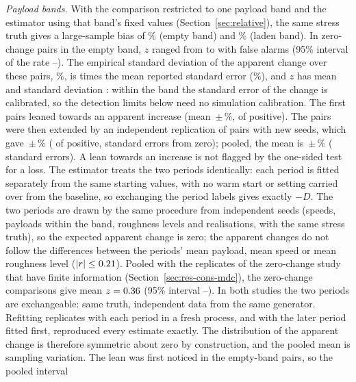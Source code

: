 \emph{Payload bands.} With the comparison restricted to one payload band and the estimator using that
band's fixed values (Section~\ref{sec:relative}), the same stress truth gives a large-sample bias of
\BandEmptyPseudo\% (empty band) and \BandLadenPseudo\% (laden band). In \BandEmptyPairsN{} zero-change
pairs in the empty band, $z$ ranged from \BandEmptyZMin{} to \BandEmptyZMax{} with \BandEmptyPairsFA{}
false alarms (95\% interval of the rate \BandEmptyPairsFALo--\BandEmptyPairsFAHi). The empirical
standard deviation of the apparent change over these pairs, \LeanSDPct\%, is \LeanSDOverSE{} times the
mean reported standard error (\LeanSEPct\%), and $z$ has mean \LeanZMean{} and standard deviation
\LeanZSD: within the band the standard error of the change is calibrated, so the detection limits below
need no simulation calibration. The first \LeanOneN{} pairs leaned towards an apparent increase (mean
\LeanOneMean\,$\pm$\,\LeanOneSE\%, \LeanOnePos{} of \LeanOneN{} positive). The pairs were then extended by
an independent replication of \LeanTwoN{} pairs with new seeds, which gave \LeanTwoMean\,$\pm$\,\LeanTwoSE\%
(\LeanTwoPos{} of \LeanTwoN{} positive, \LeanTwoZ{} standard errors from zero); pooled, the mean is
\LeanMean\,$\pm$\,\LeanMeanSE\% (\LeanMeanZ{} standard errors). A lean towards an increase is not flagged
by the one-sided test for a loss. The estimator treats the two periods identically: each period is fitted
separately from the same starting values, with no warm start or setting carried over from the baseline, so
exchanging the period labels gives exactly $-D$. The two periods are drawn by the same procedure from
independent seeds (speeds, payloads within the band, roughness levels and realisations, with the same
stress truth), so the expected apparent change is zero; the apparent changes do not follow the differences
between the periods' mean payload, mean speed or mean roughness level ($|r| \le 0.21$). Pooled with the
\ZeroFiniteN{} replicates of the zero-change study that have finite information
(Section~\ref{sec:res-cons-mdc}), the \LeanPoolN{} zero-change comparisons give mean $z = 0.36$
(95\% interval \LeanPoolZLo--\LeanPoolZHi). In both studies the two periods are exchangeable: same
truth, independent data from the same generator. Refitting \FitOrderReps{} replicates with each period
in a fresh process, and with the later period fitted first, reproduced every estimate exactly. The
distribution of the apparent change is therefore symmetric about zero by construction, and the pooled
mean is sampling variation. The lean was first noticed in the empty-band pairs, so the pooled interval
